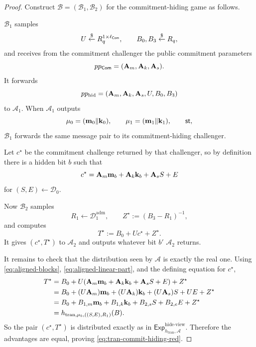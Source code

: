 \begin{proof}
Construct \(\mathcal B=(\mathcal B_1,\mathcal B_2)\) for the commitment-hiding game as follows.

\(\mathcal B_1\) samples
\[
U\overset{\$}{\leftarrow} R_q^{1\times \ell_{\mathsf{Com}}},\qquad B_0,B_3\overset{\$}{\leftarrow} R_q,
\]
and receives from the commitment challenger the public commitment parameters
\[
pp_{\mathsf{Com}}=(\mathbf{A}_m,\mathbf{A}_k,\mathbf{A}_s).
\]
It forwards
\[
pp_{\mathrm{hid}}=(\mathbf{A}_m,\mathbf{A}_k,\mathbf{A}_s,U,B_0,B_3)
\]
to \(\mathcal A_1\). When \(\mathcal A_1\) outputs
\[
\mathbf{\mu}_0=(\mathbf{m}_0\Vert \mathbf{k}_0),\qquad \mathbf{\mu}_1=(\mathbf{m}_1\Vert \mathbf{k}_1),\qquad \mathsf{st},
\]
\(\mathcal B_1\) forwards the same message pair to its commitment-hiding challenger.

Let \(c^\star\) be the commitment challenge returned by that challenger, so by definition there is a hidden bit \(b\)
such that
\[
c^\star = \mathbf{A}_m\mathbf{m}_b + \mathbf{A}_k\mathbf{k}_b + \mathbf{A}_s S + E
\]
for \((S,E)\gets \mathcal D_0\).

Now \(\mathcal B_2\) samples
\[
R_1\gets \mathcal D_1^{\mathrm{adm}},
\qquad
Z^\star := (B_3-R_1)^{-1},
\]
and computes
\begin{equation}\label{eq:tran-commit-red-target}
T^\star := B_0 + Uc^\star + Z^\star.
\end{equation}
It gives \((c^\star,T^\star)\) to \(\mathcal A_2\) and outputs whatever bit \(b'\) \(\mathcal A_2\)
returns.

It remains to check that the distribution seen by \(\mathcal A\) is exactly the real one. Using
\eqref{eq:aligned-blocks}, \eqref{eq:aligned-linear-part}, and the defining equation for \(c^\star\),
\begin{equation}\label{eq:tran-commit-red-distribution}
\begin{aligned}
T^\star
&= B_0 + U(\mathbf{A}_m\mathbf{m}_b + \mathbf{A}_k\mathbf{k}_b + \mathbf{A}_s S + E) + Z^\star \\
&= B_0 + (U\mathbf{A}_m)\mathbf{m}_b + (U\mathbf{A}_k)\mathbf{k}_b + (U\mathbf{A}_s)S + UE + Z^\star \\
&= B_0 + B_{1,m}\mathbf{m}_b + B_{1,k}\mathbf{k}_b + B_{2,s}S + B_{2,e}E + Z^\star \\
&= h_{\mathrm{tran},\mathbf{\mu}_b,((S,E),R_1)}(B).
\end{aligned}
\end{equation}
So the pair \((c^\star,T^\star)\) is distributed exactly as in
\(\mathsf{Exp}^{\mathrm{hide\mbox{-}view}}_{h_{\mathrm{tran}},\mathcal A}\). Therefore the advantages are equal,
proving \eqref{eq:tran-commit-hiding-red}.
\end{proof}

